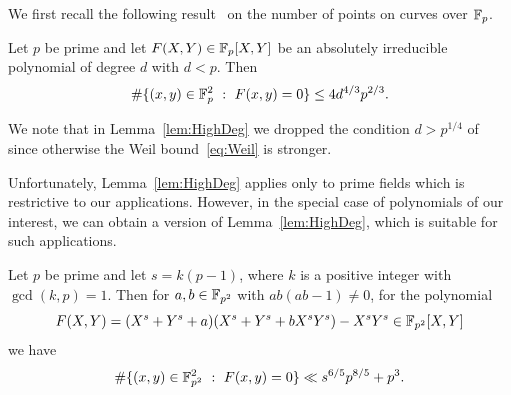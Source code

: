 \documentclass[12pt]{amsart}
\begin{document}
We first recall the following result~\cite[Theorem~(i)]{Vol}  on the number of points on curves over  ${\mathbb F}_p$. 

 \begin{lem}
\label{lem:HighDeg} Let $p$ be prime and let 
$F(X,Y) \in {\mathbb F}_p[X,Y]$ be an absolutely irreducible polynomial of degree $d$ with 
$d < p$.  
Then
$$
\# \{(x,y) \in {\mathbb F}_p^2~:~F(x,y) = 0\} \le 4d^{4/3} p^{2/3}. 
$$
\end{lem}

We note that in  Lemma~\ref{lem:HighDeg} we dropped  the condition $d > p^{1/4}$ 
of~\cite[Theorem~(i)]{Vol}  since otherwise the Weil bound~\eqref{eq:Weil} 
is stronger.

Unfortunately, Lemma~\ref{lem:HighDeg} applies only to prime fields which is restrictive 
to our applications. However, in the special case of polynomials of our 
interest, we can obtain a version of  Lemma~\ref{lem:HighDeg}, which is suitable 
for such applications. 


\begin{lemma}
\label{lem:HighDeg-Fp2} Let $p$ be prime and let  $s= k(p-1)$, where $k$ is a positive 
integer with $\gcd(k,p)=1$.   
Then  for  $a,b \in {\mathbb F}_{p^2} $ with $ab(ab-1) \ne 0$, for  the polynomial
$$
F(X,Y) = ( X^s + Y^s +a) ( X^s + Y^s + bX^s Y^s) -  X^s Y^s \in 
{\mathbb F}_{p^2} [X,Y]
$$
we have
$$
\# \{(x,y) \in {\mathbb F}_{p^2}^2~:~F(x,y) = 0\} \ll s^{6/5}p^{8/5} + p^3. 
$$
\end{lemma}
\end{document}
